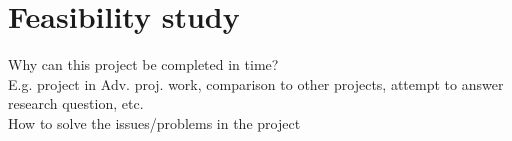 \chapter{Feasibility study}
\label{chapter6:feasibility_study}

Why can this project be completed in time?  \\

E.g. project in Adv. proj. work, comparison to other projects, attempt to answer research question, etc. \\
How to solve the issues/problems in the project